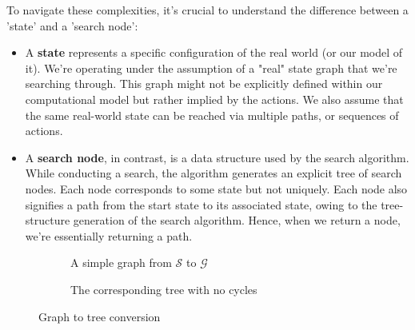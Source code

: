 \documentclass[a4paper,UKenglish,cleveref, autoref, thm-restate]{qlinhta}
\begin{document}
To navigate these complexities, it's crucial to understand the difference between a 'state' and a 'search node':
\begin{itemize}
    \item A \textbf{state} represents a specific configuration of the real world (or our model of it). We're operating under the assumption of a "real" state graph that we're searching through. This graph might not be explicitly defined within our computational model but rather implied by the actions. We also assume that the same real-world state can be reached via multiple paths, or sequences of actions.
    \item A \textbf{search node}, in contrast, is a data structure used by the search algorithm. While conducting a search, the algorithm generates an explicit tree of search nodes. Each node corresponds to some state but not uniquely. Each node also signifies a path from the start state to its associated state, owing to the tree-structure generation of the search algorithm. Hence, when we return a node, we're essentially returning a path.
\end{itemize}

\begin{figure}[h]
    \centering
    \begin{subfigure}{.5\textwidth}
        \centering
        \caption{A simple graph from $\mathcal{S}$ to $\mathcal{G}$}
    \end{subfigure}%
    \begin{subfigure}{.5\textwidth}
        \centering
        \caption{The corresponding tree with no cycles}
    \end{subfigure}
    \caption{Graph to tree conversion}
    \label{fig:conversion_tree}
\end{figure}
\end{document}

